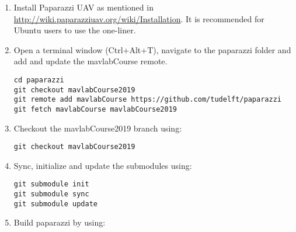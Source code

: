 \documentclass{article}
\begin{document}
\begin{enumerate}
\item{Install Paparazzi UAV as mentioned in \url{http://wiki.paparazziuav.org/wiki/Installation}. It is recommended for Ubuntu users to use the one-liner.}
\item{Open a terminal window (Ctrl+Alt+T), navigate to the paparazzi folder and add and update the mavlabCourse remote.
\begin{lstlisting}[style=Bash]
cd paparazzi
git checkout mavlabCourse2019
git remote add mavlabCourse https://github.com/tudelft/paparazzi
git fetch mavlabCourse mavlabCourse2019
\end{lstlisting}
}
\item{Checkout the mavlabCourse2019 branch using:
\begin{lstlisting}[style=Bash]
git checkout mavlabCourse2019
\end{lstlisting}
}
\item{Sync, initialize and update the submodules using:
\begin{lstlisting}[style=Bash]
git submodule init
git submodule sync
git submodule update
\end{lstlisting}
}
\item{Build paparazzi by using:

}
\end{enumerate}
\end{document}
